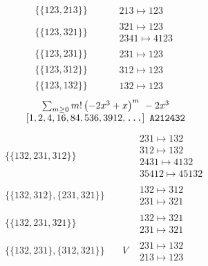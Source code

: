 \begin{tiny}
\begin{align}
\{\{123, 213\}\}
\quad
&
\phantom{.}
&
\begin{matrix}
213 \mapsto 123
\end{matrix}
\\
\{\{123, 321\}\}
\quad
&
\phantom{.}
&
\begin{matrix}
321 \mapsto 123\\2341 \mapsto 4123
\end{matrix}
\\
\{\{123, 231\}\}
\quad
&
\phantom{.}
&
\begin{matrix}
231 \mapsto 123
\end{matrix}
\\
\{\{123, 312\}\}
\quad
&
\phantom{.}
&
\begin{matrix}
312 \mapsto 123
\end{matrix}
\\
\{\{123, 132\}\}
\quad
&
\phantom{.}
&
\begin{matrix}
132 \mapsto 123
\end{matrix}
\end{align}
$$
\begin{matrix}
\sum_{m \geq 0} m! \left(
-2 x^{3} + x
\right)^m
\ 
-2 x^{3}
\\
\left[1, 2, 4, 16, 84, 536, 3912, \text{\texttt{...}}\right]
\ 
\texttt{A212432}
\end{matrix}
$$
\vspace{-1em}
\begin{align}
\{\{132, 231, 312\}\}
\quad
&
\phantom{.}
&
\begin{matrix}
231 \mapsto 132\\312 \mapsto 132\\2431 \mapsto 4132\\35412 \mapsto 45132
\end{matrix}
\\
\{\{132, 312\}, \{231, 321\}\}
\quad
&
\phantom{.}
&
\begin{matrix}
132 \mapsto 312\\231 \mapsto 321
\end{matrix}
\\
\{\{132, 231, 321\}\}
\quad
&
\phantom{.}
&
\begin{matrix}
132 \mapsto 321\\231 \mapsto 321
\end{matrix}
\\
\{\{132, 231\}, \{312, 321\}\}
\quad
&
V
&
\begin{matrix}
231 \mapsto 132\\213 \mapsto 123

\end{matrix}
\end{align}
\end{tiny}
